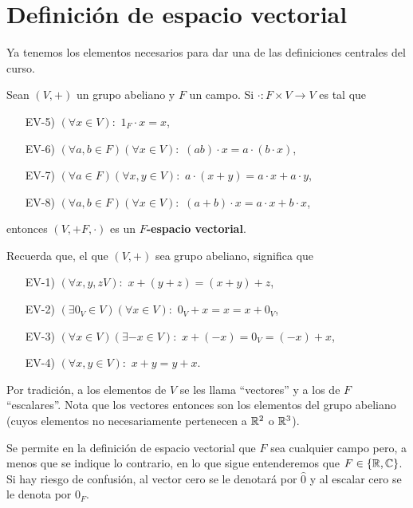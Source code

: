 \section{Definición de espacio vectorial}
Ya tenemos los elementos necesarios para dar una de las definiciones
centrales del curso.

\begin{defi}
	\label{defi: espacio vectorial}
	Sean $(V, +)$ un grupo abeliano y $F$ un campo. Si 
	$\cdot : F \times V \longrightarrow V$ es tal que 
	\begin{itemize}
		\item[EV-5)] $(\forall x \in V):$ $1_{F} \cdot x = x$,
		\item[EV-6)] $(\forall a, b \in F) (\forall x \in V):$
		$(ab) \cdot x = a \cdot (b \cdot x)$,
		\item[EV-7)] $(\forall a \in F)(\forall x, y \in V):$
		$a\cdot (x + y) = a \cdot x + a \cdot y$,
		\item[EV-8)] $(\forall a, b \in F)(\forall x \in V): $
		$(a+b) \cdot x = a \cdot x + b \cdot x $,
	\end{itemize}
	entonces $(V, + F, \cdot)$ es un \textbf{$F$-espacio vectorial}.
\end{defi}
Recuerda que, el que $(V, +)$ sea grupo abeliano, significa que 
\begin{itemize}
	\item[EV-1)] $(\forall x, y, z V):$ $x + (y+z) = (x+y) + z$,
	\item[EV-2)] $(\exists 0_{V} \in V) (\forall x \in V):$
	$0_{V} + x = x = x + 0_{V}$,
	\item[EV-3)] $(\forall x \in V)(\exists -x \in V):$
	$x + (-x) = 0_{V} = (-x) + x$,
	\item[EV-4)] $(\forall x, y \in V): $
	$x+y = y +x$.
\end{itemize}

Por tradición, a los elementos de $V$ se les llama ``vectores'' y a los
de $F$ ``escalares''. Nota que los vectores entonces son los elementos del 
grupo abeliano (cuyos elementos no necesariamente pertenecen a $\mathbb{R}^{2}$
o $\mathbb{R}^{3}$).

Se permite en la definición de espacio vectorial que $F$ sea cualquier campo
pero, a menos que se indique lo contrario, en lo que sigue entenderemos que
$F \in \{ \mathbb{R}, \mathbb{C} \}$.
Si hay riesgo de confusión, al vector cero se le denotará por $\hat{0}$
y al escalar cero se le denota por $0_{F}$. 


